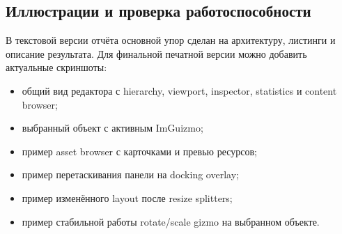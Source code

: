 \documentclass[a4paper,14pt]{extarticle}
\begin{document}
\subsection{Иллюстрации и проверка работоспособности}
В текстовой версии отчёта основной упор сделан на архитектуру, листинги и описание результата. Для финальной печатной версии можно добавить актуальные скриншоты:
\begin{itemize}
  \item общий вид редактора с hierarchy, viewport, inspector, statistics и content browser;
  \item выбранный объект с активным ImGuizmo;
  \item пример asset browser с карточками и превью ресурсов;
  \item пример перетаскивания панели на docking overlay;
  \item пример изменённого layout после resize splitters;
  \item пример стабильной работы rotate/scale gizmo на выбранном объекте.
\end{itemize}
\end{document}
